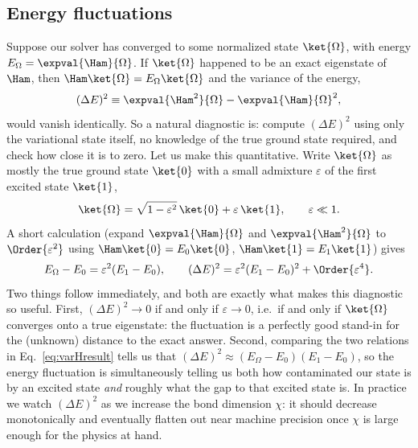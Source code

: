 \documentclass[all_sessions.tex]{subfiles}
\begin{document}
\subsection{Energy fluctuations}
Suppose our solver has converged to some normalized state $\ket{\Omega}$, with energy
$E_\Omega = \expval{\Ham}{\Omega}$. If $\ket{\Omega}$ happened to be an exact eigenstate of
$\Ham$, then $\Ham\ket{\Omega} = E_\Omega\ket{\Omega}$ and the variance of the energy,
\begin{equation}
  (\Delta E)^2 \equiv \expval{\Ham^2}{\Omega} - \expval{\Ham}{\Omega}^2,
  \label{eq:varH}
\end{equation}
would vanish identically. So a natural diagnostic is: compute $(\Delta E)^2$ using only the
variational state itself, no knowledge of the true ground state required, and check how close it
is to zero. Let us make this quantitative. Write $\ket{\Omega}$ as mostly the true ground state
$\ket{0}$ with a small admixture $\varepsilon$ of the first excited state $\ket{1}$,
\begin{equation}
  \ket{\Omega} = \sqrt{1-\varepsilon^2}\,\ket{0} + \varepsilon\,\ket{1}, \qquad \varepsilon\ll 1.
\end{equation}
A short calculation (expand $\expval{\Ham}{\Omega}$ and $\expval{\Ham^2}{\Omega}$ to
$\Order{\varepsilon^2}$ using $\Ham\ket{0}=E_0\ket{0}$, $\Ham\ket{1}=E_1\ket{1}$) gives
\begin{equation}
  E_\Omega - E_0 = \varepsilon^2(E_1-E_0), \qquad
  (\Delta E)^2 = \varepsilon^2(E_1-E_0)^2 + \Order{\varepsilon^4}.
  \label{eq:varHresult}
\end{equation}
Two things follow immediately, and both are exactly what makes this diagnostic so useful. First,
$(\Delta E)^2 \to 0$ if and only if $\varepsilon\to 0$, i.e.\ if and only if $\ket{\Omega}$
converges onto a true eigenstate: the fluctuation is a perfectly good stand-in for the (unknown)
distance to the exact answer. Second, comparing the two relations in
Eq.~\eqref{eq:varHresult} tells us that $(\Delta E)^2 \approx (E_\Omega - E_0)(E_1-E_0)$, so the
energy fluctuation is simultaneously telling us both how contaminated our state is by an excited
state \emph{and} roughly what the gap to that excited state is. In practice we watch
$(\Delta E)^2$ as we increase the bond dimension $\chi$: it should decrease monotonically and
eventually flatten out near machine precision once $\chi$ is large enough for the physics at hand.
\end{document}
